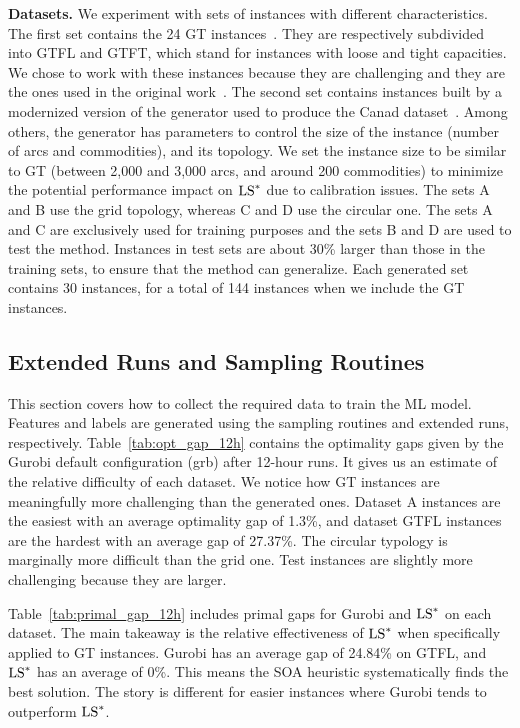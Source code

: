 \documentclass[3p, authoryear, times, doubleblind]{elsarticle}
\begin{document}
{\textbf{Datasets. } We experiment with sets of instances with different characteristics. The first set contains the 24 GT instances~\citep{hewitt_combining_2010}. They are respectively subdivided into GTFL and GTFT, which stand for instances with loose and tight capacities. We chose to work with these instances because they are challenging and they are the ones used in the original work~\citep{katayama_mip_2020}. The second set contains instances built by a modernized version of the generator used to produce the Canad dataset~\citep{larsen_pseudo-random_2023}. Among others, the generator has parameters to control the size of the instance (number of arcs and commodities), and its topology. We set the instance size to be similar to GT (between 2,000 and 3,000 arcs, and around 200 commodities) to minimize the potential performance impact on $\text{LS}^*$ due to calibration issues. The sets A and B use the grid topology, whereas C and D use the circular one. The sets A and C are exclusively used for training purposes and the sets B and D are used to test the method. Instances in test sets are about 30\% larger than those in the training sets, to ensure that the method can generalize. Each generated set contains 30 instances, for a total of 144 instances when we include the GT instances.  




\subsection{Extended Runs and Sampling Routines} \label{sec:extended_runs}

This section covers how to collect the required data to train the ML model. Features and labels are generated using the sampling routines and extended runs, respectively. Table~\ref{tab:opt_gap_12h} contains the optimality gaps given by the Gurobi default configuration (grb) after 12-hour runs. It gives us an estimate of the relative difficulty of each dataset. We notice how GT instances are meaningfully more challenging than the generated ones. Dataset A instances are the easiest with an average optimality gap of 1.3\%, and dataset GTFL instances are the hardest with an average gap of 27.37\%. The circular typology is marginally more difficult than the grid one. Test instances are slightly more challenging because they are larger.  

Table~\ref{tab:primal_gap_12h} includes primal gaps for Gurobi and $\text{LS}^*$ on each dataset. The main takeaway is the relative effectiveness of $\text{LS}^*$ when specifically applied to GT instances. Gurobi has an average gap of 24.84\% on GTFL, and $\text{LS}^*$ has an average of 0\%. This means the SOA heuristic systematically finds the best solution. The story is different for easier instances where Gurobi tends to outperform $\text{LS}^*$.  

}
\end{document}
